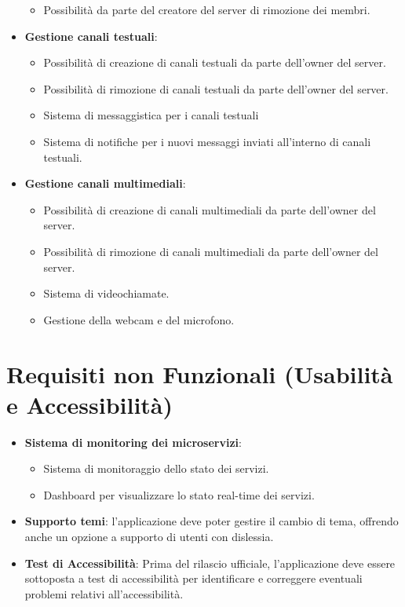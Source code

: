 \begin{itemize}
\begin{itemize}
        \item Possibilità da parte del creatore del server di rimozione dei membri.
    \end{itemize}
    \item \textbf{Gestione canali testuali}:
    \begin{itemize}
        \item Possibilità di creazione di canali testuali da parte dell'owner del server.
        \item Possibilità di rimozione di canali testuali da parte dell'owner del server.
        \item Sistema di messaggistica per i canali testuali
        \item Sistema di notifiche per i nuovi messaggi inviati all'interno di canali testuali.
    \end{itemize}
    \item \textbf{Gestione canali multimediali}:
    \begin{itemize}
        \item Possibilità di creazione di canali multimediali da parte dell'owner del server.
        \item Possibilità di rimozione di canali multimediali da parte dell'owner del server.
        \item Sistema di videochiamate.
        \item Gestione della webcam e del microfono.
    \end{itemize}
\end{itemize}

\section{Requisiti non Funzionali (Usabilità e Accessibilità)}
\begin{itemize}
    \item \textbf{Sistema di monitoring dei microservizi}:
    \begin{itemize}
        \item Sistema di monitoraggio dello stato dei servizi.
        \item Dashboard per visualizzare lo stato real-time dei servizi.
    \end{itemize}
    
    \item \textbf{Supporto temi}: l'applicazione deve poter gestire il cambio di tema, offrendo anche un opzione a supporto di utenti con dislessia.
    
    \item \textbf{Test di Accessibilità}: Prima del rilascio ufficiale, l'applicazione deve essere sottoposta a test di accessibilità per identificare e correggere eventuali problemi relativi all'accessibilità.
\end{itemize}


